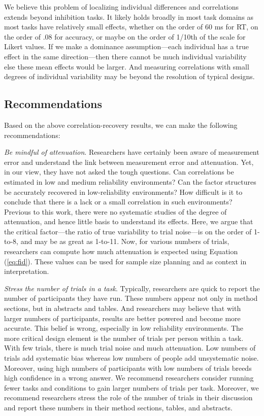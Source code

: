 \documentclass[
  english,
  ,man]{apa6}
\begin{document}
We believe this problem of localizing individual differences and correlations extends beyond inhibition tasks. It likely holds broadly in most task domains as most tasks have relatively small effects, whether on the order of 60 ms for RT, on the order of .08 for accuracy, or maybe on the order of 1/10th of the scale for Likert values. If we make a dominance assumption---each individual has a true effect in the same direction---then there cannot be much individual variability else these mean effects would be larger. And measuring correlations with small degrees of individual variability may be beyond the resolution of typical designs.

\hypertarget{recommendations}{%
\subsection{Recommendations}\label{recommendations}}

Based on the above correlation-recovery results, we can make the following recommendations:

\emph{Be mindful of attenuation}. Researchers have certainly been aware of measurement error and understand the link between measurement error and attenuation. Yet, in our view, they have not asked the tough questions. Can correlations be estimated in low and medium reliability environments? Can the factor structures be accurately recovered in low-reliability environments? How difficult is it to conclude that there is a lack or a small correlation in such environments? Previous to this work, there were no systematic studies of the degree of attenuation, and hence little basis to understand its effects. Here, we argue that the critical factor---the ratio of true variability to trial noise---is on the order of 1-to-8, and may be as great as 1-to-11. Now, for various numbers of trials, researchers can compute how much attenuation is expected using Equation (\ref{eq:fid}). These values can be used for sample size planning and as context in interpretation.

\emph{Stress the number of trials in a task}. Typically, researchers are quick to report the number of participants they have run. These numbers appear not only in method sections, but in abstracts and tables. And researchers may believe that with larger numbers of participants, results are better powered and become more accurate. This belief is wrong, especially in low reliability environments. The more critical design element is the number of trials per person within a task. With few trials, there is much trial noise and much attenuation. Low numbers of trials add systematic bias whereas low numbers of people add unsystematic noise. Moreover, using high numbers of participants with low numbers of trials breeds high confidence in a wrong answer. We recommend researchers consider running fewer tasks and conditions to gain larger numbers of trials per task. Moreover, we recommend researchers stress the role of the number of trials in their discussion and report these numbers in their method sections, tables, and abstracts.
\end{document}
